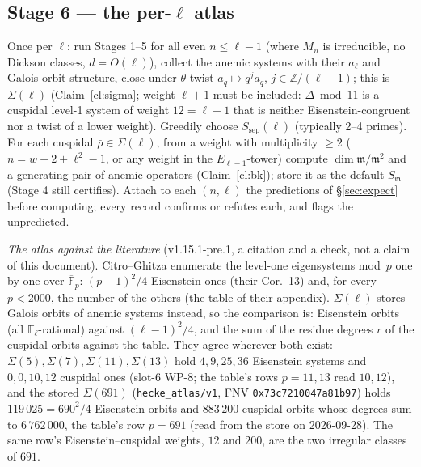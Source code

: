 \documentclass[11pt]{article}
\theoremstyle{remark}
\newcommand{\F}{\mathbb{F}}
\newcommand{\Z}{\mathbb{Z}}
\newcommand{\De}{\Delta}
\newcommand{\Fl}{\F_\ell}
\newcommand{\m}{\mathfrak{m}}
\newcommand{\Mn}{M_n}
\begin{document}
\subsection*{Stage 6 --- the per-$\ell$ atlas}\label{sec:atlas}
Once per $\ell$: run Stages 1--5 for all even $n\le\ell-1$ (where $\Mn$ is irreducible, no Dickson
classes, $d=O(\ell)$), collect the anemic systems with their $a_\ell$ and Galois-orbit structure,
close under $\theta$-twist $a_q\mapsto q^ja_q$, $j\in\Z/(\ell-1)$; this is $\Sigma(\ell)$
(Claim~\ref{cl:sigma}; weight $\ell+1$ must be included: $\De\bmod11$ is a cuspidal level-1
system of weight $12=\ell+1$ that is neither Eisenstein-congruent nor a twist of a lower
weight). Greedily choose $S_{\mathrm{sep}}(\ell)$ (typically 2--4 primes). For
each cuspidal $\bar\rho\in\Sigma(\ell)$, from a weight with multiplicity $\ge2$
($n=w-2+\ell^2-1$, or any weight in the $E_{\ell-1}$-tower) compute $\dim\m/\m^2$ and a generating
pair of anemic operators (Claim~\ref{cl:bk}); store it as the default $S_\m$ (Stage 4 still
certifies). Attach to each $(n,\ell)$ the predictions of \S\ref{sec:expect} before computing;
every record confirms or refutes each, and flags the unpredicted.

\noindent\emph{The atlas against the literature} (v1.15.1-pre.1, a citation and a check, not a claim of this document).
Citro--Ghitza \cite{citro_ghitza} enumerate the level-one eigensystems mod~$p$ one by one over $\overline{\F}_p$: $(p-1)^2/4$
Eisenstein ones (their Cor.~13) and, for every $p<2000$, the number of the others (the table of their appendix). $\Sigma(\ell)$
stores Galois orbits of anemic systems instead, so the comparison is: Eisenstein orbits (all $\Fl$-rational) against
$(\ell-1)^2/4$, and the sum of the residue degrees $r$ of the cuspidal orbits against the table. They agree wherever both exist:
$\Sigma(5),\Sigma(7),\Sigma(11),\Sigma(13)$ hold $4,9,25,36$ Eisenstein systems and $0,0,10,12$ cuspidal ones (slot-6 WP-8; the
table's rows $p=11,13$ read $10,12$), and the stored $\Sigma(691)$ (\texttt{hecke\_atlas/v1}, FNV \texttt{0x73c7210047a81b97})
holds $119\,025=690^2/4$ Eisenstein orbits and $883\,200$ cuspidal orbits whose degrees sum to $6\,762\,000$, the table's row
$p=691$ (read from the store on 2026-09-28). The same row's Eisenstein--cuspidal weights, $12$ and $200$, are the two irregular
classes of $691$.
\end{document}
